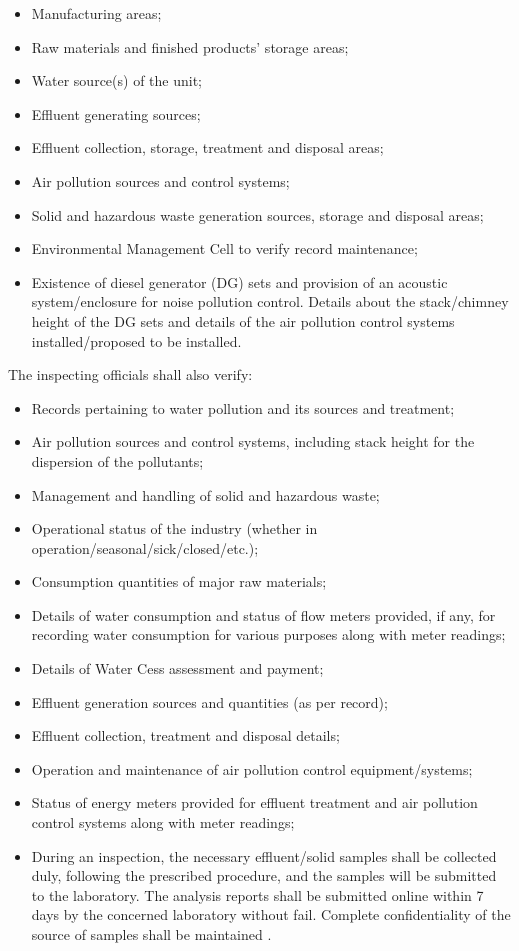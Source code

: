 \documentclass[a4paper, 12pt]{article}
\begin{document}
		\begin{itemize}[noitemsep,nolistsep]
		\item{Manufacturing areas;}
		\item{Raw materials and finished products’ storage areas;}
		\item{Water source(s) of the unit;}
		\item{Effluent generating sources;}
		\item{Effluent collection, storage, treatment and disposal areas;}
		\item{Air pollution sources and control systems;}
		\item{Solid and hazardous waste generation sources, storage and disposal areas;}
		\item{Environmental Management Cell to verify record maintenance;}
		\item{Existence of diesel generator (DG) sets and provision of an acoustic system/enclosure for noise pollution control. Details about the stack/chimney height of the DG sets and details of the air pollution control systems installed/proposed to be installed.} \\ 
		\end{itemize}
		
		The inspecting officials shall also verify:
		
		\begin{itemize}[noitemsep,nolistsep]
		\item{Records pertaining to water pollution and its sources and treatment;}
		\item{Air pollution sources and control systems, including stack height for the dispersion of the pollutants;}
		\item{Management and handling of solid and hazardous waste;}
		\item{Operational status of the industry (whether in operation/seasonal/sick/closed/etc.);}
		\item{Consumption quantities of major raw materials;}
		\item{Details of water consumption and status of flow meters provided, if any, for recording water consumption for various purposes along with meter readings;}
		\item{Details of Water Cess assessment and payment;}
		\item{Effluent generation sources and quantities (as per record);}
		\item{Effluent collection, treatment and disposal details;}
		\item{Operation and maintenance of air pollution control equipment/systems;}
		\item{Status of energy meters provided for effluent treatment and air pollution control systems along with meter readings;}
		\item{During an inspection, the necessary effluent/solid samples shall be collected duly, following the prescribed procedure, and the samples will be submitted to the laboratory. The analysis reports shall be submitted online within 7 days by the concerned laboratory without fail. Complete confidentiality of the source of samples shall be maintained \parencite{DPCCb}}.
		\end{itemize}
		
\end{document}
